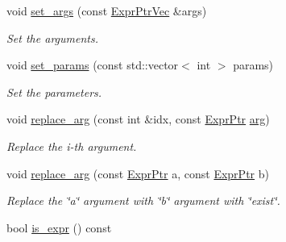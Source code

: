 \begin{DoxyCompactItemize}
void \mbox{\hyperlink{classilang_1_1_expr_a1e506485812df66b1e5436e4db668fae}{set\+\_\+args}} (const \mbox{\hyperlink{classilang_1_1_expr_a17efc8282f647681d37cd4c78928aa01}{Expr\+Ptr\+Vec}} \&args)
\begin{DoxyCompactList}\small\item\em Set the arguments. \end{DoxyCompactList}\item 
\mbox{\label{classilang_1_1_expr_a9028b056abab5ba74372506cc0174551}} 
void \mbox{\hyperlink{classilang_1_1_expr_a9028b056abab5ba74372506cc0174551}{set\+\_\+params}} (const std\+::vector$<$ int $>$ params)
\begin{DoxyCompactList}\small\item\em Set the parameters. \end{DoxyCompactList}\item 
\mbox{\label{classilang_1_1_expr_a8381c199449b5f0b2fad610360ba8bc3}} 
void \mbox{\hyperlink{classilang_1_1_expr_a8381c199449b5f0b2fad610360ba8bc3}{replace\+\_\+arg}} (const int \&idx, const \mbox{\hyperlink{classilang_1_1_expr_a85952b6a34620c4c8cab6bac9c9fdf8c}{Expr\+Ptr}} \mbox{\hyperlink{classilang_1_1_expr_a754c28cd350d28c7bdc8fffe7fe22ec2}{arg}})
\begin{DoxyCompactList}\small\item\em Replace the i-\/th argument. \end{DoxyCompactList}\item 
\mbox{\label{classilang_1_1_expr_a00c141f79e644f44e4ea0e54811821e3}} 
void \mbox{\hyperlink{classilang_1_1_expr_a00c141f79e644f44e4ea0e54811821e3}{replace\+\_\+arg}} (const \mbox{\hyperlink{classilang_1_1_expr_a85952b6a34620c4c8cab6bac9c9fdf8c}{Expr\+Ptr}} a, const \mbox{\hyperlink{classilang_1_1_expr_a85952b6a34620c4c8cab6bac9c9fdf8c}{Expr\+Ptr}} b)
\begin{DoxyCompactList}\small\item\em Replace the \char`\"{}a\char`\"{} argument with \char`\"{}b\char`\"{} argument with \char`\"{}exist\char`\"{}. \end{DoxyCompactList}\item 
\mbox{\label{classilang_1_1_expr_ae77e44b5507512a5d5b935db00725498}} 
bool \mbox{\hyperlink{classilang_1_1_expr_ae77e44b5507512a5d5b935db00725498}{is\+\_\+expr}} () const

\end{DoxyCompactItemize}
